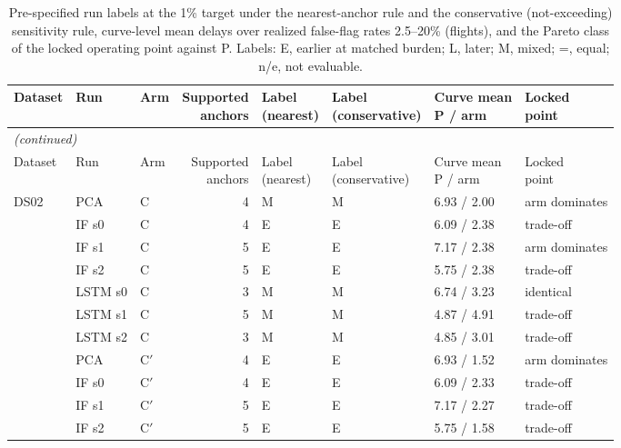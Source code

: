 \begin{scriptsize}
\begin{longtable}{lllrllll}
\caption{Pre-specified run labels at the 1\% target under the nearest-anchor rule and the conservative (not-exceeding) sensitivity rule, curve-level mean delays over realized false-flag rates 2.5--20\% (flights), and the Pareto class of the locked operating point against P. Labels: E, earlier at matched burden; L, later; M, mixed; =, equal; n/e, not evaluable.}\label{tab:s14_labels}\\
\toprule
Dataset & Run & Arm & \makecell{Supported\\anchors} & \makecell{Label\\(nearest)} & \makecell{Label\\(conservative)} & \makecell{Curve mean\\P / arm} & \makecell{Locked\\point} \\
\midrule
\endfirsthead
\multicolumn{8}{l}{\emph{(continued)}}\\
\toprule
Dataset & Run & Arm & \makecell{Supported\\anchors} & \makecell{Label\\(nearest)} & \makecell{Label\\(conservative)} & \makecell{Curve mean\\P / arm} & \makecell{Locked\\point} \\
\midrule
\endhead
\bottomrule
\endfoot
DS02 & PCA & C & 4 & M & M & 6.93 / 2.00 & arm dominates \\
 & IF s0 & C & 4 & E & E & 6.09 / 2.38 & trade-off \\
 & IF s1 & C & 5 & E & E & 7.17 / 2.38 & arm dominates \\
 & IF s2 & C & 5 & E & E & 5.75 / 2.38 & trade-off \\
 & LSTM s0 & C & 3 & M & M & 6.74 / 3.23 & identical \\
 & LSTM s1 & C & 5 & M & M & 4.87 / 4.91 & trade-off \\
 & LSTM s2 & C & 3 & M & M & 4.85 / 3.01 & trade-off \\
 & PCA & C$'$ & 4 & E & E & 6.93 / 1.52 & arm dominates \\
 & IF s0 & C$'$ & 4 & E & E & 6.09 / 2.33 & trade-off \\
 & IF s1 & C$'$ & 5 & E & E & 7.17 / 2.27 & trade-off \\
 & IF s2 & C$'$ & 5 & E & E & 5.75 / 1.58 & trade-off \\

\end{longtable}
\end{scriptsize}
